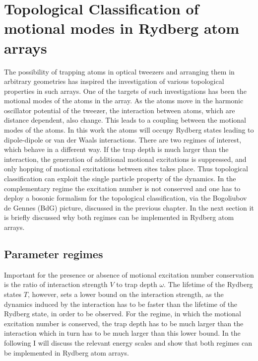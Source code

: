 \chapter{Topological Classification of motional modes in Rydberg atom arrays}
The possibility of trapping atoms in optical tweezers and arranging them in arbitrary geometries has inspired the investigation of various topological properties in such arrays. One of the targets of such investigations has been the motional modes of the atoms in the array. As the atoms move in the harmonic oscillator potential of the tweezer, the interaction between atoms, which are distance dependent, also change. This leads to a coupling between the motional modes of the atoms. In this work the atoms will occupy Rydberg states leading to dipole-dipole or van der Waals interactions. There are two regimes of interest, which behave in a different way. If the trap depth is much larger than the interaction, the generation of additional motional excitations is suppressed, and only hopping of motional excitations between sites takes place. Thus topological classification can exploit the single particle property of the dynamics. In the complementary regime the excitation number is not conserved and one has to deploy a bosonic formalism for the topological classification, via the Bogoliubov de Gennes (BdG) picture, discussed in the previous chapter. In the next section it is briefly discussed why both regimes can be implemented in Rydberg atom arrays.

\section{Parameter regimes}
Important for the presence or absence of motional excitation number conservation is the ratio of interaction strength $V$ to trap depth $\omega$. The lifetime of the Rydberg states $T$, however, sets a lower bound on the interaction strength, as the dynamics induced by the interaction has to be faster than the lifetime of the Rydberg state, in order to be observed. For the regime, in which the motional excitation number is conserved, the trap depth has to be much larger than the interaction which in turn has to be much larger than this lower bound. In the following I will discuss the relevant energy scales and show that both regimes can be implemented in Rydberg atom arrays.

